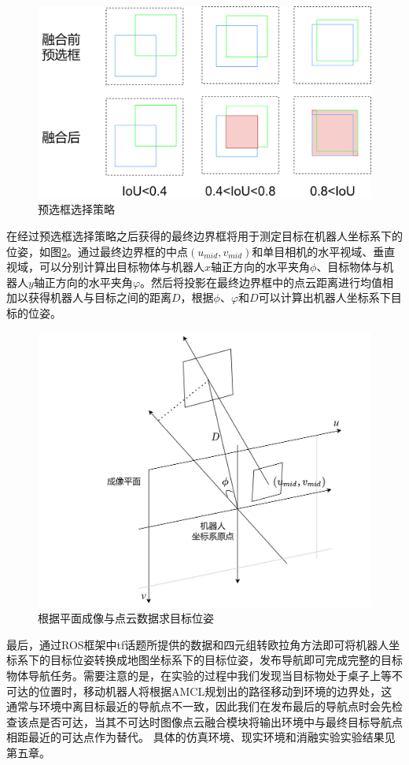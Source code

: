 \begin{figure}[htbp]
    \centering
    \includegraphics[scale=0.11]{Fig/iou.png}
    \caption{\label{iou}预选框选择策略}
\end{figure}

在经过预选框选择策略之后获得的最终边界框将用于测定目标在机器人坐标系下的位姿，如图\ref{target_pose}。通过最终边界框的中点$\left( {{u_{mid}},{v_{mid}}} \right)$和单目相机的水平视域、垂直视域，可以分别计算出目标物体与机器人$x$轴正方向的水平夹角$\phi $、目标物体与机器人$y$轴正方向的水平夹角$\varphi $。然后将投影在最终边界框中的点云距离进行均值相加以获得机器人与目标之间的距离$D$，根据$\phi $、$\varphi $和$D$可以计算出机器人坐标系下目标的位姿。
\begin{figure}[htbp]
    \centering
    \includegraphics[scale=0.12]{Fig/目标坐标..png}
    \caption{\label{target_pose}根据平面成像与点云数据求目标位姿}
\end{figure}
最后，通过ROS框架中tf话题所提供的数据和四元组转欧拉角方法即可将机器人坐标系下的目标位姿转换成地图坐标系下的目标位姿，发布导航即可完成完整的目标物体导航任务。需要注意的是，在实验的过程中我们发现当目标物处于桌子上等不可达的位置时，移动机器人将根据AMCL规划出的路径移动到环境的边界处，这通常与环境中离目标最近的导航点不一致，因此我们在发布最后的导航点时会先检查该点是否可达，当其不可达时图像点云融合模块将输出环境中与最终目标导航点相距最近的可达点作为替代。
具体的仿真环境、现实环境和消融实验实验结果见第五章。





